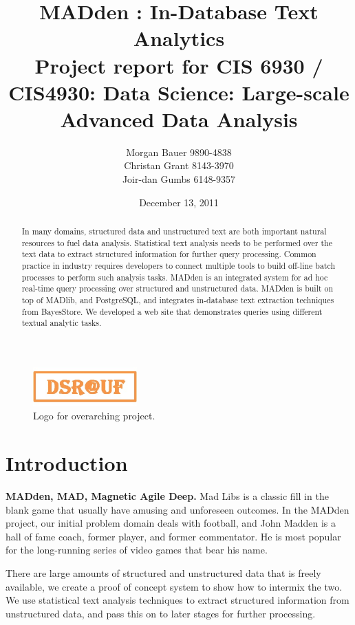 \documentclass[11pt,onecolumn]{article}
\title{MADden : In-Database Text Analytics \\
{\small Project report for CIS 6930 / CIS4930: Data Science: Large-scale Advanced Data Analysis}}
\author{Morgan Bauer 9890-4838 \\
  Christan Grant 8143-3970 \\
  Joir-dan Gumbs 6148-9357}
\date{December 13, 2011}
\newcommand{\system}{MADden\xspace}
\begin{document}
\maketitle

\begin{figure}
  \begin{center}
    \includegraphics[width=40mm]{logo.jpg}
    \caption{Logo for overarching project.}
    \label{fig:logo}
  \end{center}
\end{figure}


\begin{abstract}
In many domains, structured data and unstructured text are
both important natural resources to fuel data analysis. Statistical
text analysis needs to be performed over the text data to extract
structured information for further query processing. Common practice
in industry requires developers to connect multiple tools to build
off-line batch processes to perform such analysis tasks. \system is
an integrated system for ad hoc real-time query processing over
structured and unstructured data. \system is built on top of MADlib,
and PostgreSQL, and integrates in-database text extraction
techniques from BayesStore. 
We developed a web site that demonstrates queries using different
textual analytic tasks.
\end{abstract}


  \section{Introduction}

  \textbf{\system, MAD, Magnetic Agile Deep.}
  Mad Libs is a classic fill in the blank game that usually have amusing and unforeseen outcomes.
  In the \system project, our initial problem domain deals with football,
  and John Madden is a hall of fame coach, former player, and former commentator.
	He is most popular
  for the long-running series of video games that bear his name.

    There are large amounts of structured and unstructured data that is freely available,
		we create a proof of concept system to show how to intermix the two.
    We use statistical text analysis techniques to extract structured information from unstructured 
		data, and pass this on to later stages for further processing.
\end{document}
